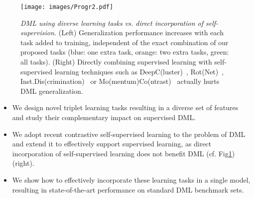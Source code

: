 \documentclass[runningheads]{llncs}
\begin{document}
\begin{figure}[t]
    \centering
    \texttt{[image: images/Progr2.pdf]}
    \caption{\textit{DML using diverse learning tasks vs. direct incorporation of self-supervision.} (Left) Generalization performance increases with each task added to training, independent of the exact combination of our proposed tasks (blue: one extra task, orange: two extra tasks, green: all tasks). (Right) Directly combining supervised learning with self-supervised learning techniques such as DeepC(luster)~\cite{deepcluster}, Rot(Net)~\cite{predict_rotations}, Inst.Dis(crimination)~\cite{wu2018unsupervised} or Mo(mentum)Co(ntrast)~\cite{moco} actually hurts DML generalization.}
\label{fig:first_page}
\end{figure} 
\begin{itemize}
    \item We design novel triplet learning tasks resulting in a diverse set of features and study their complementary impact on supervised DML.
    \item We adopt recent contrastive self-supervised learning to the problem of DML and extend it to effectively support supervised learning, as direct incorporation of self-supervised learning does not benefit DML (cf. Fig\ref{fig:first_page}) (right).
    \item We show how to effectively incorporate these learning tasks in a single model, resulting in state-of-the-art performance on standard DML benchmark sets.
\end{itemize}
\end{document}
